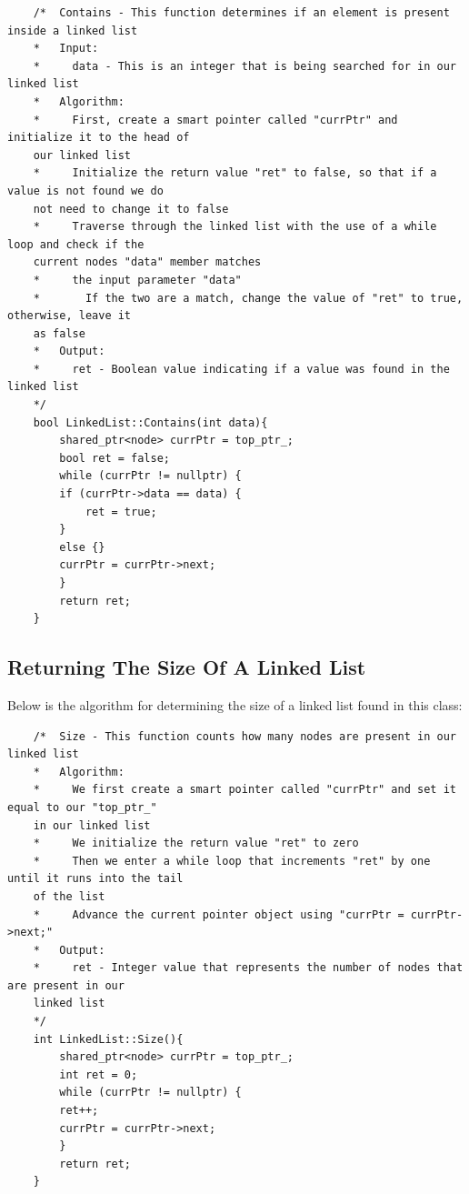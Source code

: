 \documentclass[a4paper,9pt]{article}
\begin{document}
\begin{highlight}
    \begin{verbatim}
    /*  Contains - This function determines if an element is present inside a linked list
    *   Input:
    *     data - This is an integer that is being searched for in our linked list
    *   Algorithm:
    *     First, create a smart pointer called "currPtr" and initialize it to the head of 
    our linked list
    *     Initialize the return value "ret" to false, so that if a value is not found we do 
    not need to change it to false
    *     Traverse through the linked list with the use of a while loop and check if the 
    current nodes "data" member matches
    *     the input parameter "data"
    *       If the two are a match, change the value of "ret" to true, otherwise, leave it 
    as false
    *   Output:
    *     ret - Boolean value indicating if a value was found in the linked list
    */
    bool LinkedList::Contains(int data){
        shared_ptr<node> currPtr = top_ptr_;
        bool ret = false;
        while (currPtr != nullptr) {
        if (currPtr->data == data) {
            ret = true;
        }
        else {}
        currPtr = currPtr->next;
        }
        return ret;
    }
    \end{verbatim}
\end{highlight}

\subsection*{Returning The Size Of A Linked List}

Below is the algorithm for determining the size of a linked list found in this class:

\begin{highlight}
    \begin{verbatim}
    /*  Size - This function counts how many nodes are present in our linked list
    *   Algorithm:
    *     We first create a smart pointer called "currPtr" and set it equal to our "top_ptr_" 
    in our linked list
    *     We initialize the return value "ret" to zero
    *     Then we enter a while loop that increments "ret" by one until it runs into the tail 
    of the list
    *     Advance the current pointer object using "currPtr = currPtr->next;"
    *   Output:
    *     ret - Integer value that represents the number of nodes that are present in our 
    linked list
    */
    int LinkedList::Size(){
        shared_ptr<node> currPtr = top_ptr_;
        int ret = 0;
        while (currPtr != nullptr) {
        ret++;
        currPtr = currPtr->next;
        }
        return ret;
    }
    \end{verbatim}
\end{highlight}
\end{document}
